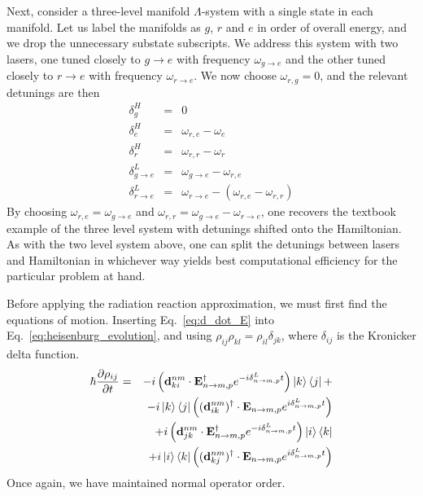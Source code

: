 \documentclass[final,5p,times,twocolumn]{elsarticle}
\begin{document}
Next, consider a three-level manifold $\Lambda$-system with a single state in each manifold.  Let us label the manifolds as $g$, $r$ and $e$ in order of overall energy, and we drop the unnecessary substate subscripts.  We address this system with two lasers, one tuned closely to $g\rightarrow e$ with frequency $\omega_{g\rightarrow e}$ and the other tuned closely to $r\rightarrow e$ with frequency $\omega_{r\rightarrow e}$.  We now choose $\omega_{r,g} = 0$, and the relevant detunings are then
\begin{eqnarray}
	\delta^H_g & = & 0 \\
	\delta^H_e & = & \omega_{r,e} - \omega_e \\
	\delta^H_r & = & \omega_{r,r} - \omega_r \\
	\delta^L_{g\rightarrow e} & = & \omega_{g\rightarrow e} - \omega_{r,e} \\
	\delta^L_{r\rightarrow e} & = & \omega_{r\rightarrow e} - (\omega_{r,e}-\omega_{r,r})
\end{eqnarray}
By choosing $\omega_{r,e} = \omega_{g\rightarrow e}$ and $\omega_{r,r} = \omega_{g\rightarrow e} - \omega_{r\rightarrow e}$, one recovers the textbook example of the three level system with detunings shifted onto the Hamiltonian.  As with the two level system above, one can split the detunings between lasers and Hamiltonian in whichever way yields best computational efficiency for the particular problem at hand.

Before applying the radiation reaction approximation, we must first find the equations of motion.
Inserting Eq.~\ref{eq:d_dot_E} into Eq.~\ref{eq:heisenburg_evolution}, and using $\rho_{ij}\rho_{kl} = \rho_{il}\delta_{jk}$, where $\delta_{ij}$ is the Kronicker delta function.
\begin{eqnarray}
	\hbar\frac{\partial \rho_{ij}}{\partial t} 
	& = & -i\left(\mathbf{d}^{nm}_{ki}\cdot\mathbf{E}^\dagger_{n\rightarrow m,p} e^{-i\delta^L_{n\rightarrow m, p}  t} \right)  \ket{k}\Bra{j} +  \nonumber \\
	& & -i \ket{k}\Bra{j} \left((\mathbf{d}^{nm}_{ik})^\dagger \cdot \mathbf{E}_{n\rightarrow m,p}e^{i\delta^L_{n\rightarrow m, p}t}\right) \nonumber \\
	& & +i \left(\mathbf{d}^{nm}_{jk}\cdot\mathbf{E}^\dagger_{n\rightarrow m,p} e^{-i\delta^L_{n\rightarrow m, p}  t} \right)\ket{i}\Bra{k}  \nonumber \\
	& & +i \ket{i}\Bra{k} \left((\mathbf{d}^{nm}_{kj})^\dagger \cdot \mathbf{E}_{n\rightarrow m,p}e^{i\delta^L_{n\rightarrow m, p}t}\right) \label{eq:E_coherent_ev}
\end{eqnarray}
Once again, we have maintained normal operator order.
\end{document}
